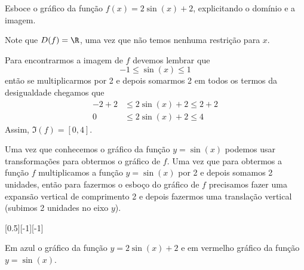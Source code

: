 \begin{example}
  Esboce o gráfico da função
  \(f(x)= 2 \sin(x) +2\),
  explicitando o domínio e a imagem.

  \solution
  Note que $D(f)=\R$, uma vez que não temos nenhuma restrição para $x$.

  Para encontrarmos a imagem de $f$ devemos lembrar que
  \[
    -1 \leq \sin(x) \leq 1
  \]
  então se multiplicarmos por 2
  e depois somarmos 2 em todos os
  termos da desigualdade chegamos que
  \begin{align*}
    -2+2 & \leq 2 \sin(x) + 2 \leq 2+2 \\
    0    & \leq 2 \sin(x) + 2 \leq 4
  \end{align*}
  Assim, $\Im(f) = [0, 4]$.

  Uma vez que conhecemos o gráfico da função $y=\sin(x)$ podemos usar
  transformações para obtermos o gráfico de $f$. Uma vez que para obtermos
  a função $f$ multiplicamos a função $y=\sin(x)$ por 2 e depois somamos
  2 unidades, então para fazermos o esboço do gráfico de $f$ precisamos
  fazer uma expansão vertical de comprimento 2 e depois fazermos uma
  translação vertical (subimos 2 unidades no eixo $y$).

  [0.5][-1][-1]

  Em azul o gráfico da função $y=2\sin(x)+2$
  e em vermelho gráfico da função $y=\sin(x)$.
\end{example}


